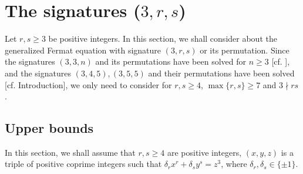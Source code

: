 \documentclass[a4paper, 12pt]{article}
\def\mathbf#1{#1}%
\numberwithin{equation}{section}
\theoremstyle{definition}
\begin{document}
\section{The signatures ($\mathbf{3,r,s}$)}

Let $r,s\ge 3$ be positive integers. In this section, we shall consider about the generalized Fermat equation with signature $(3,r,s)$ or its permutation.
Since the signatures $(3,3,n)$ and its permutations have been solved for $n\ge 3$ [cf. \cite{Diophantine_after_IUT_I}],  and the signatures $(3,4,5), (3,5,5)$ and their permutations have been solved [cf. Introduction],
we only need to consider for $r,s \ge 4$, $\max\{r,s\} \ge 7$ and $3\nmid rs$.

\subsection{Upper bounds}
In this section, we shall assume that $r,s \ge 4$ are positive integers, $(x,y,z)$ is a triple of positive coprime integers such that $\delta_r x^r + \delta_s y^s = z^3$, where $\delta_r,\delta_s \in \{\pm 1\}$.
\end{document}
